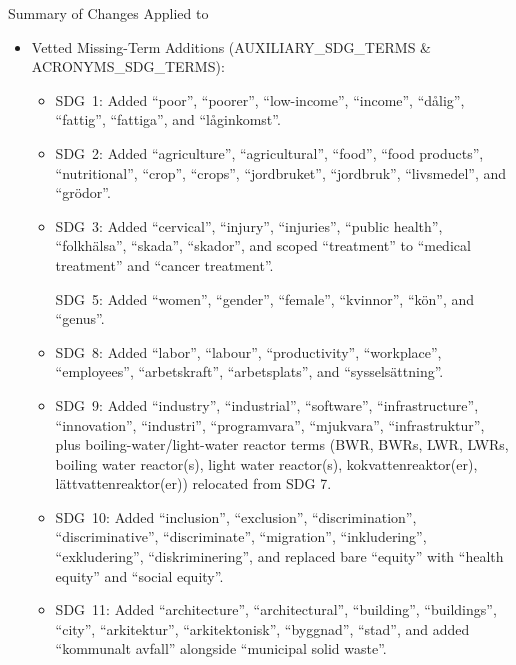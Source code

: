 Summary of Changes Applied to 
\begin{itemize}
\item Vetted Missing-Term Additions (AUXILIARY\_SDG\_TERMS \& ACRONYMS\_SDG\_TERMS):
\begin{itemize}
\item \gls{SDG}~1: Added \enquote{poor}, \enquote{poorer}, \enquote{low-income}, \enquote{income}, \enquote{dålig}, \enquote{fattig}, \enquote{fattiga}, and \enquote{låginkomst}.

\item \gls{SDG}~2: Added \enquote{agriculture}, \enquote{agricultural}, \enquote{food}, \enquote{food products}, \enquote{nutritional}, \enquote{crop}, \enquote{crops}, \enquote{jordbruket}, \enquote{jordbruk}, \enquote{livsmedel}, and \enquote{grödor}.   

\item \gls{SDG}~3: Added \enquote{cervical}, \enquote{injury}, \enquote{injuries}, \enquote{public health}, \enquote{folkhälsa}, \enquote{skada}, \enquote{skador}, and scoped \enquote{treatment} to \enquote{medical treatment} and \enquote{cancer treatment}.

\gls{SDG}~5: Added \enquote{women}, \enquote{gender}, \enquote{female}, \enquote{kvinnor}, \enquote{kön}, and \enquote{genus}.

\item \gls{SDG}~8: Added \enquote{labor}, \enquote{labour}, \enquote{productivity}, \enquote{workplace}, \enquote{employees}, \enquote{arbetskraft}, \enquote{arbetsplats}, and \enquote{sysselsättning}.

\item \gls{SDG}~9: Added \enquote{industry}, \enquote{industrial}, \enquote{software}, \enquote{infrastructure}, \enquote{innovation}, \enquote{industri}, \enquote{programvara}, \enquote{mjukvara}, \enquote{infrastruktur}, plus boiling-water/light-water reactor terms (BWR, BWRs, LWR, LWRs, boiling water reactor(s), light water reactor(s), kokvattenreaktor(er), lättvattenreaktor(er)) relocated from SDG 7.

\item \gls{SDG}~10: Added \enquote{inclusion}, \enquote{exclusion}, \enquote{discrimination}, \enquote{discriminative}, \enquote{discriminate}, \enquote{migration}, \enquote{inkludering}, \enquote{exkludering}, \enquote{diskriminering}, and replaced bare \enquote{equity} with \enquote{health equity} and \enquote{social equity}.

\item \gls{SDG}~11: Added \enquote{architecture}, \enquote{architectural}, \enquote{building}, \enquote{buildings}, \enquote{city}, \enquote{arkitektur}, \enquote{arkitektonisk}, \enquote{byggnad}, \enquote{stad}, and added \enquote{kommunalt avfall} alongside \enquote{municipal solid waste}.


\end{itemize}
\end{itemize}
